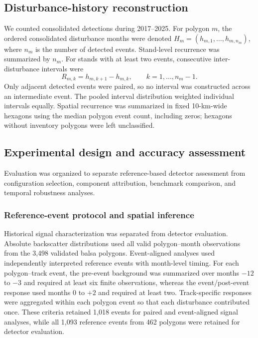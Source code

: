 \subsection{Disturbance-history reconstruction}
\label{sec:history}

We counted consolidated detections during 2017--2025. For polygon $m$, the ordered consolidated disturbance months were denoted $H_m=(h_{m,1},\ldots,h_{m,n_m})$, where $n_m$ is the number of detected events. Stand-level recurrence was summarized by $n_m$. For stands with at least two events, consecutive inter-disturbance intervals were
\begin{equation}
    R_{m,k}=h_{m,k+1}-h_{m,k},
    \qquad k=1,\ldots,n_m-1.
\end{equation}
Only adjacent detected events were paired, so no interval was constructed across an intermediate event. The pooled interval distribution weighted individual intervals equally. Spatial recurrence was summarized in fixed 10-km-wide hexagons using the median polygon event count, including zeros; hexagons without inventory polygons were left unclassified.


\subsection{Experimental design and accuracy assessment}
\label{sec:experimental_evaluation}

Evaluation was organized to separate reference-based detector assessment from configuration selection, component attribution, benchmark comparison, and temporal robustness analyses. 

\subsubsection{Reference-event protocol and spatial inference}
\label{sec:reference_spatial_inference}

Historical signal characterization was separated from detector evaluation. Absolute backscatter distributions used all valid polygon--month observations from the 3,498 validated balsa polygons. Event-aligned analyses used independently interpreted reference events with month-level timing. For each polygon--track event, the pre-event background was summarized over months $-12$ to $-3$ and required at least six finite observations, whereas the event/post-event response used months 0 to $+2$ and required at least two. Track-specific responses were aggregated within each polygon event so that each disturbance contributed once. These criteria retained 1,018 events for paired and event-aligned signal analyses, while all 1,093 reference events from 462 polygons were retained for detector evaluation.

